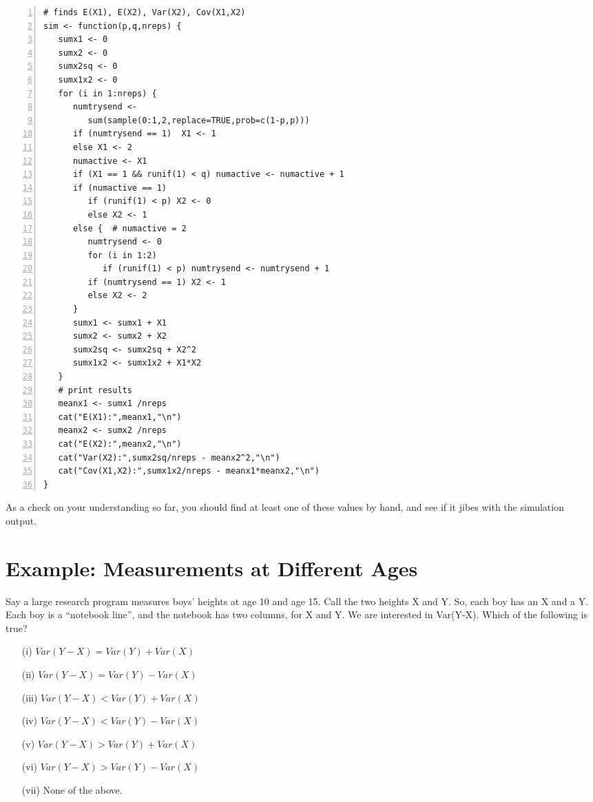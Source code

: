 \begin{Verbatim}[fontsize=\relsize{-2},numbers=left]
# finds E(X1), E(X2), Var(X2), Cov(X1,X2)
sim <- function(p,q,nreps) {
   sumx1 <- 0
   sumx2 <- 0
   sumx2sq <- 0
   sumx1x2 <- 0
   for (i in 1:nreps) {
      numtrysend <- 
         sum(sample(0:1,2,replace=TRUE,prob=c(1-p,p)))
      if (numtrysend == 1)  X1 <- 1
      else X1 <- 2
      numactive <- X1
      if (X1 == 1 && runif(1) < q) numactive <- numactive + 1
      if (numactive == 1)
         if (runif(1) < p) X2 <- 0
         else X2 <- 1
      else {  # numactive = 2
         numtrysend <- 0
         for (i in 1:2)
            if (runif(1) < p) numtrysend <- numtrysend + 1
         if (numtrysend == 1) X2 <- 1
         else X2 <- 2
      }
      sumx1 <- sumx1 + X1
      sumx2 <- sumx2 + X2
      sumx2sq <- sumx2sq + X2^2
      sumx1x2 <- sumx1x2 + X1*X2
   }
   # print results
   meanx1 <- sumx1 /nreps
   cat("E(X1):",meanx1,"\n")
   meanx2 <- sumx2 /nreps
   cat("E(X2):",meanx2,"\n")
   cat("Var(X2):",sumx2sq/nreps - meanx2^2,"\n")
   cat("Cov(X1,X2):",sumx1x2/nreps - meanx1*meanx2,"\n")
}
\end{Verbatim}

As a check on your understanding so far, you should find at least one of
these values by hand, and see if it jibes with the simulation output.

\section{Example:  Measurements at Different Ages}

Say a large research program measures boys' heights at age
10 and age 15.  Call the two heights X and Y.  So, each boy has an X
and a Y.  Each boy is a ``notebook line'', and the notebook has two
columns, for X and Y.  We are interested in Var(Y-X).  Which of the
following is true?

\begin{itemize}

\item [(i)] $Var(Y-X) = Var(Y) + Var(X)$
\item [(ii)] $Var(Y-X) = Var(Y) - Var(X)$
\item [(iii)] $Var(Y-X) < Var(Y) + Var(X)$
\item [(iv)] $Var(Y-X) < Var(Y) - Var(X)$
\item [(v)] $Var(Y-X) > Var(Y) + Var(X)$
\item [(vi)] $Var(Y-X) > Var(Y) - Var(X)$
\item [(vii)] None of the above.

\end{itemize}

